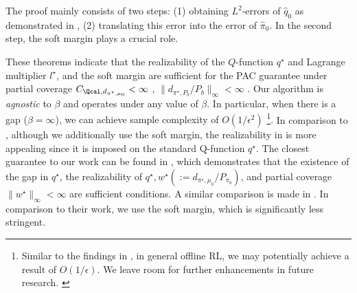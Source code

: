 The proof mainly consists of two steps: (1) obtaining $L^2$-errors of $\hat q_{0}$ as demonstrated in , (2) translating this error into the error of $\hat \pi_{0}$. In the second step, the soft margin plays a crucial role.

These theorems indicate that the realizability of the $Q$-function $q^{\star}$ and Lagrange multiplier $l^{\star}$, and the soft margin are sufficient for the PAC guarantee under partial coverage $C_{\Qcal,d_{\pi^{\star},\mu_0} }<\infty$ {\finaledit , $\|d_{\pi^{\star},P_b}/P_b\|_{\infty}<\infty$ }. Our algorithm is \emph{agnostic} to $\beta$ and operates under any value of $\beta$. {\finaledit In particular, when there is a gap ($\beta=\infty$), we can achieve sample complexity of $O(1/\epsilon^2)$ \footnote{{Similar to the findings in \citet{wang2022gap}, in general offline RL, we may potentially achieve a result of $O(1/\epsilon)$. We leave room for further enhancements in future research. }
}.} In comparison to , although we additionally use the soft margin, the realizability in  is more appealing since it is imposed on the standard Q-function $q^{\star}$. 
The closest guarantee to our work can be found in \citet{chen2022offline}, which demonstrates that the existence of the gap in $q^{\star}$, the realizability of $q^{\star},w^{\star}(:=d_{\pi^{\star},\mu_0}/P_{\pi_b})$, and partial coverage $\|w^{\star}\|_{\infty}< \infty$ are sufficient conditions. { A similar comparison is made in \citet{ozdaglar2023revisiting}.} In comparison to their work, we use the soft margin, which is significantly less stringent. 







